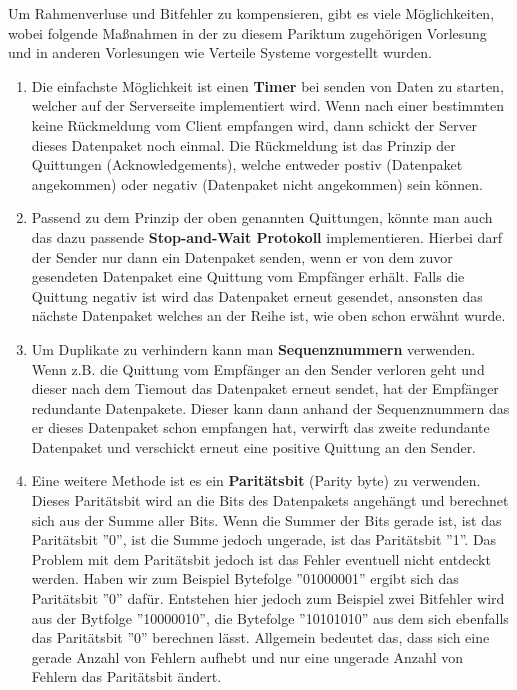 \documentclass{scrartcl}
\begin{document}
  Um Rahmenverluse und Bitfehler zu kompensieren, gibt es viele Möglichkeiten, wobei folgende Maßnahmen in der zu diesem Pariktum zugehörigen Vorlesung und in anderen Vorlesungen wie Verteile Systeme vorgestellt wurden.
  
    \begin{enumerate}
    \item Die einfachste Möglichkeit ist einen \textbf{Timer} bei senden von Daten zu starten, welcher auf der Serverseite implementiert wird. Wenn nach einer bestimmten keine Rückmeldung vom Client empfangen wird, dann schickt der Server dieses Datenpaket noch einmal. Die Rückmeldung ist das Prinzip der Quittungen (Acknowledgements), welche entweder postiv (Datenpaket angekommen) oder negativ (Datenpaket nicht angekommen) sein können.
    \item Passend zu dem Prinzip der oben genannten Quittungen, könnte man auch das dazu passende \textbf{Stop-and-Wait Protokoll} implementieren. Hierbei darf der Sender nur dann ein Datenpaket senden, wenn er von dem zuvor gesendeten Datenpaket eine Quittung vom Empfänger erhält. Falls die Quittung negativ ist wird das Datenpaket erneut gesendet, ansonsten das nächste Datenpaket welches an der Reihe ist, wie oben schon erwähnt wurde.
    \item Um Duplikate zu verhindern kann man \textbf{Sequenznummern} verwenden. Wenn z.B. die Quittung vom Empfänger an den Sender verloren geht und dieser nach dem Tiemout das Datenpaket erneut sendet, hat der Empfänger redundante Datenpakete. Dieser kann dann anhand der Sequenznummern das er dieses Datenpaket schon empfangen hat, verwirft das zweite redundante Datenpaket und verschickt erneut eine positive Quittung an den Sender. 
    \item Eine weitere Methode ist es ein \textbf{Paritätsbit} (Parity byte) zu verwenden. Dieses Paritätsbit wird an die Bits des Datenpakets angehängt und berechnet sich aus der Summe aller Bits. Wenn die Summer der Bits gerade ist, ist das Paritätsbit ''0'', ist die Summe jedoch ungerade, ist das Paritätsbit ''1''. Das Problem mit dem Paritätsbit jedoch ist das Fehler eventuell nicht entdeckt werden. Haben wir zum Beispiel Bytefolge ''01000001'' ergibt sich das Paritätsbit ''0'' dafür. Entstehen hier jedoch zum Beispiel zwei Bitfehler wird aus der Bytfolge ''10000010'', die Bytefolge ''10101010'' aus dem sich ebenfalls das Paritätsbit ''0'' berechnen lässt. Allgemein bedeutet das, dass sich eine gerade Anzahl von Fehlern aufhebt und nur eine ungerade Anzahl von Fehlern das Paritätsbit ändert. 
  \end{enumerate}
  
\end{document}
